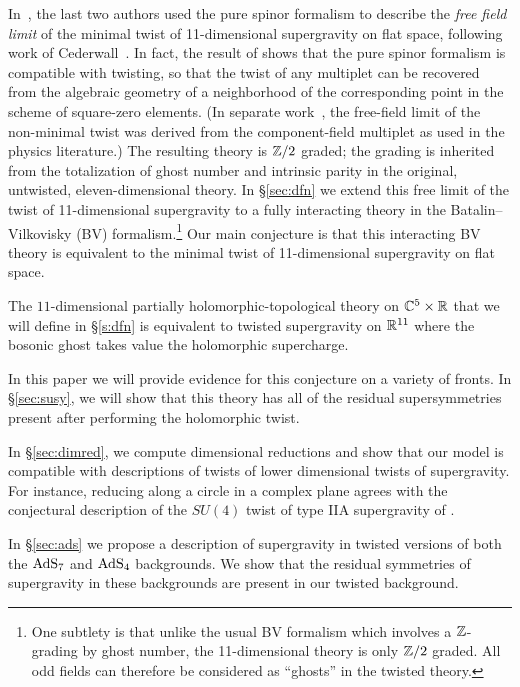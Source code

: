 In~\cite{SWspinor}, the last two authors used the pure spinor formalism to describe the {\em free field limit} of the minimal twist of 11-dimensional supergravity on flat space, following work of Cederwall~\cite{Ced-towards,Ced-11d}. In fact, the result of \cite{SWspinor} shows that the pure spinor formalism is compatible with twisting, so that the twist of any multiplet can be recovered from the algebraic geometry of a neighborhood of the corresponding point in the scheme of square-zero elements.
(In separate work~\cite{EagerHahner}, the free-field limit of the non-minimal twist was derived from the component-field multiplet as used in the physics literature.)
The resulting theory is $\mathbb Z/2$ graded; the grading is inherited from the totalization of ghost number and intrinsic parity in the original, untwisted, eleven-dimensional theory.
In \S\ref{sec:dfn} we extend this free limit of the twist of 11-dimensional supergravity to a fully interacting theory in the Batalin--Vilkovisky (BV) formalism.\footnote{One subtlety is that unlike the usual BV formalism which involves a $\mathbb Z$-grading by ghost number, the 11-dimensional theory is only $\mathbb Z/2$ graded.
All odd fields can therefore be considered as ``ghosts'' in the twisted theory.}
Our main conjecture is that this interacting BV theory is equivalent to the minimal twist of 11-dimensional supergravity on flat space.

\begin{conj}
The $11$-dimensional partially holomorphic-topological theory on $\mathbb C^5 \times \mathbb R$ that we will define in \S \ref{s:dfn} is equivalent to twisted supergravity on $\mathbb R^{11}$ where the bosonic ghost takes value the holomorphic supercharge. 
\end{conj}

In this paper we will provide evidence for this conjecture on a variety of fronts. 
In \S\ref{sec:susy}, we will show that this theory has all of the residual supersymmetries present after performing the holomorphic twist. 

In \S\ref{sec:dimred}, we compute dimensional reductions and show that our model is compatible with descriptions of twists of lower dimensional twists of supergravity. 
For instance, reducing along a circle in a complex plane agrees with the conjectural description of the $SU(4)$ twist of type IIA supergravity of \cite{CLsugra}.

In \S\ref{sec:ads} we propose a description of supergravity in twisted versions of both the ${\rm AdS}_7$ and ${\rm AdS}_4$ backgrounds. 
We show that the residual symmetries of supergravity in these backgrounds are present in our twisted background.

